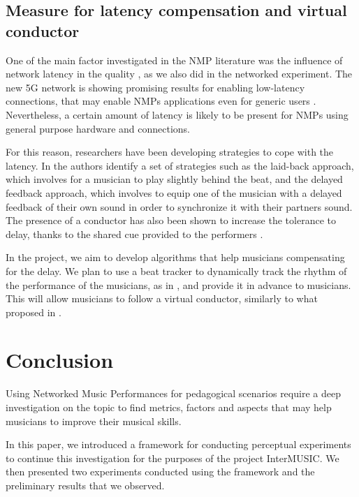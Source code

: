\documentclass[conference]{IEEEtran}
\begin{document}
\subsection{Measure for latency compensation and virtual conductor}
One of the main factor investigated in the NMP literature was the influence of network latency in the quality \cite{RottondiOverview,drioli2013networked}, as we also did in the networked experiment. The new 5G network is showing promising results for enabling low-latency connections, that may enable NMPs applications even for generic users \cite{uk5G}. Nevertheless, a certain amount of latency is likely to be present for NMPs using general purpose hardware and connections. 

For this reason, researchers have been developing strategies to cope with the latency. In \cite{Carot07networkmusic} the authors identify a set of strategies such as the laid-back approach, which involves for a musician to play slightly behind the beat, and the delayed feedback approach, which involves to equip one of the musician with a delayed feedback of their own sound in order to synchronize it with their partners sound. The presence of a conductor has also been shown to increase the tolerance to delay, thanks to the shared cue provided to the performers \cite{Olmos2009}.

In the project, we aim to develop algorithms that help musicians compensating for the delay. We plan to use a beat tracker to dynamically track the rhythm of the performance of the musicians, as in \cite{Goto2010}, and provide it in advance to musicians. This will allow musicians to follow a virtual conductor, similarly to what proposed in \cite{conductor2008}.


\section{Conclusion}\label{sec:conclusion}

Using Networked Music Performances for pedagogical scenarios require a deep investigation on the topic to find metrics, factors and aspects that may help musicians to improve their musical skills.

In this paper, we introduced a framework for conducting perceptual experiments to continue this investigation for the purposes of the project InterMUSIC. We then presented two experiments conducted using the framework and the preliminary results that we observed.
\end{document}
